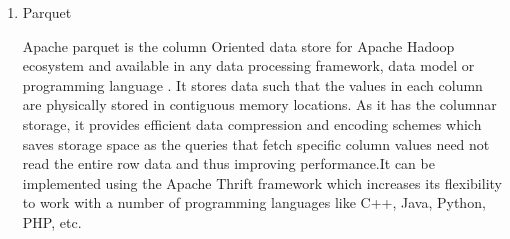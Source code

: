 \begin{enumerate}
\item {} 
Parquet

Apache parquet is the column Oriented data store for Apache
Hadoop ecosystem and available in any data processing framework,
data model or programming language \label{\detokenize{i524/technologies:id490}}{\hyperref[\detokenize{i524/technologies:www-parquet}]{\sphinxcrossref{{[}421{]}}}}. It
stores data such that the values in each column are physically
stored in contiguous memory locations. As it has the columnar
storage, it provides efficient data compression and encoding
schemes which saves storage space as the queries that fetch
specific column values need not read the entire row data and thus
improving performance.It can be implemented using the Apache
Thrift framework which increases its flexibility to work with a
number of programming languages like C++, Java, Python, PHP, etc.

\end{enumerate}


